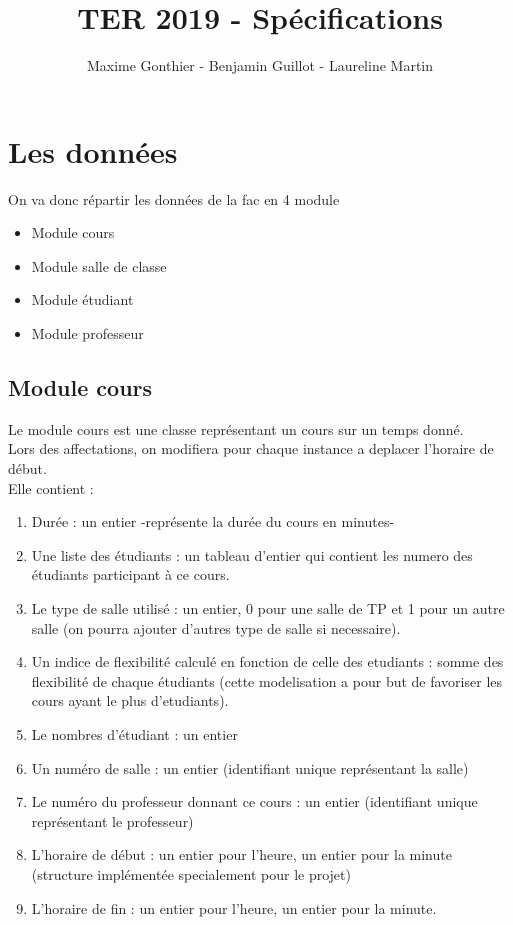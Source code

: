 \documentclass[a4paper,11pt]{article}
\title{TER 2019 - Spécifications}
\author{Maxime Gonthier - Benjamin Guillot - Laureline Martin}
\begin{document}
	\clearpage
	\maketitle

\newpage
\section{Les données}
	On va donc répartir les données de la fac en 4 module\\
	\begin{itemize}
		\item Module cours
		\item Module salle de classe
		\item Module étudiant
		\item Module professeur
	\end{itemize}
	\subsection{Module cours}
		Le module cours est une classe représentant un cours sur un temps donné.\\
		Lors des affectations, on modifiera pour chaque instance a deplacer l'horaire de début.\\
		Elle contient : 
		\begin{enumerate}
			\item Durée : un entier -représente la durée du cours en minutes-
			\item Une liste des étudiants : un tableau d'entier qui contient les numero des étudiants participant à ce cours.
			\item Le type de salle utilisé : un entier, 0 pour une salle de TP et 1 pour un autre salle (on pourra ajouter d'autres type de salle si necessaire).
			\item Un indice de flexibilité calculé en fonction de celle des etudiants : somme des flexibilité de chaque étudiants (cette modelisation a pour but de favoriser les cours ayant le plus d'etudiants).
			\item Le nombres d'étudiant : un entier
			\item Un numéro de salle : un entier (identifiant unique représentant la salle)
			\item Le numéro du professeur donnant ce cours : un entier (identifiant unique représentant le professeur)
			\item L'horaire de début : un entier pour l'heure, un entier pour la minute (structure implémentée specialement pour le projet)  
			\item L'horaire de fin : un entier pour l'heure, un entier pour la minute.
		\end{enumerate}
\end{document}
